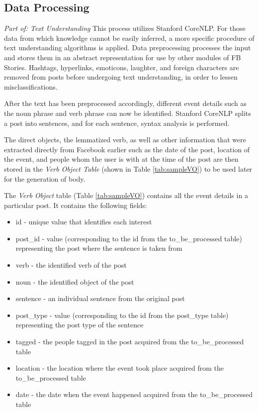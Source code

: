 \subsection{Data Processing}
\textit{Part of: Text Understanding} \newline \newline
This process utilizes Stanford CoreNLP. For those data from which knowledge cannot be easily inferred, a more specific procedure of text understanding algorithms is applied. Data preprocessing processes the input and stores them in an abstract representation for use by other modules of FB Stories. Hashtags, hyperlinks, emoticons, laughter, and foreign characters are removed from posts before undergoing text understanding, in order to lessen misclassifications.

After the text has been preprocessed accordingly, different event details such as the noun phrase and verb phrase can now be identified. Stanford CoreNLP splits a post into sentences, and for each sentence, syntax analysis is performed.

The direct objects, the lemmatized verb, as well as other information that were extracted directly from Facebook earlier such as the date of the post, location of the event, and people whom the user is with at the time of the post are then stored in the \textit{Verb Object Table} (shown in Table \ref{tab:sampleVO}) to be used later for the generation of body.

The \textit{Verb Object} table (Table \ref{tab:sampleVO}) contains all the event details in a particular post. It contains the following fields:
\begin{itemize}
	\item id - unique value that identifies each interest
	\item post\_id - value (corresponding to the id from the to\_be\_processed table) representing the post where the sentence is taken from 
	\item verb - the identified verb of the post
	\item noun - the identified object of the post
	\item sentence - an individual sentence from the original post
	\item post\_type - value (corresponding to the id from the post\_type table) representing the post type of the sentence
	\item tagged - the people tagged in the post acquired from the to\_be\_processed table
	\item location - the location where the event took place acquired from the to\_be\_processed table
	\item date - the date when the event happened acquired from the to\_be\_processed table
\end{itemize}

